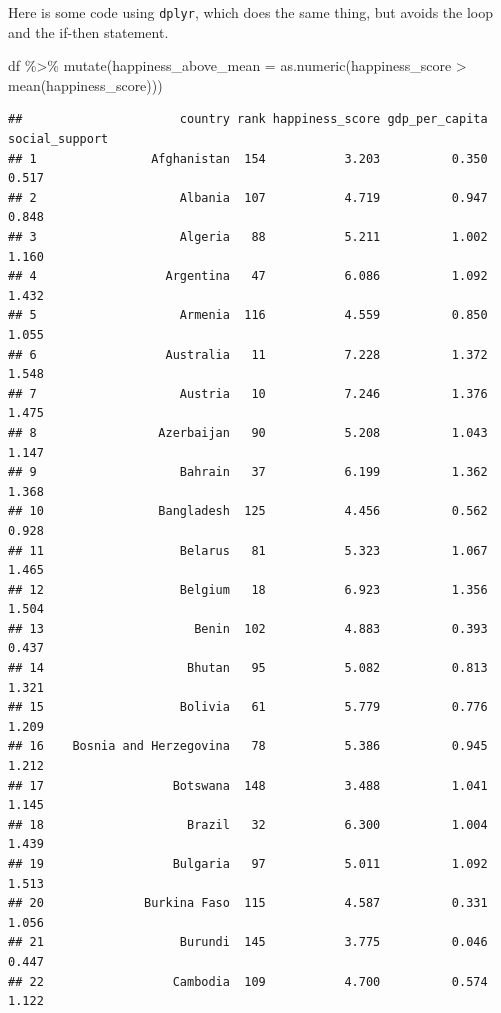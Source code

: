 \documentclass[]{article}
\newenvironment{Shaded}{\begin{snugshade}}{\end{snugshade}}
\newcommand{\AttributeTok}[1]{\textcolor[rgb]{0.77,0.63,0.00}{#1}}
\newcommand{\FunctionTok}[1]{\textcolor[rgb]{0.00,0.00,0.00}{#1}}
\newcommand{\NormalTok}[1]{#1}
\newcommand{\SpecialCharTok}[1]{\textcolor[rgb]{0.00,0.00,0.00}{#1}}
\begin{document}
Here is some code using \texttt{dplyr}, which does the same thing, but
avoids the loop and the if-then statement.

\begin{Shaded}
\begin{Highlighting}[]
\NormalTok{df }\SpecialCharTok{\%\textgreater{}\%}
  \FunctionTok{mutate}\NormalTok{(}\AttributeTok{happiness\_above\_mean =} \FunctionTok{as.numeric}\NormalTok{(happiness\_score }\SpecialCharTok{\textgreater{}} \FunctionTok{mean}\NormalTok{(happiness\_score)))}
\end{Highlighting}
\end{Shaded}

\begin{verbatim}
##                      country rank happiness_score gdp_per_capita social_support
## 1                Afghanistan  154           3.203          0.350          0.517
## 2                    Albania  107           4.719          0.947          0.848
## 3                    Algeria   88           5.211          1.002          1.160
## 4                  Argentina   47           6.086          1.092          1.432
## 5                    Armenia  116           4.559          0.850          1.055
## 6                  Australia   11           7.228          1.372          1.548
## 7                    Austria   10           7.246          1.376          1.475
## 8                 Azerbaijan   90           5.208          1.043          1.147
## 9                    Bahrain   37           6.199          1.362          1.368
## 10                Bangladesh  125           4.456          0.562          0.928
## 11                   Belarus   81           5.323          1.067          1.465
## 12                   Belgium   18           6.923          1.356          1.504
## 13                     Benin  102           4.883          0.393          0.437
## 14                    Bhutan   95           5.082          0.813          1.321
## 15                   Bolivia   61           5.779          0.776          1.209
## 16    Bosnia and Herzegovina   78           5.386          0.945          1.212
## 17                  Botswana  148           3.488          1.041          1.145
## 18                    Brazil   32           6.300          1.004          1.439
## 19                  Bulgaria   97           5.011          1.092          1.513
## 20              Burkina Faso  115           4.587          0.331          1.056
## 21                   Burundi  145           3.775          0.046          0.447
## 22                  Cambodia  109           4.700          0.574          1.122

\end{verbatim}
\end{document}
